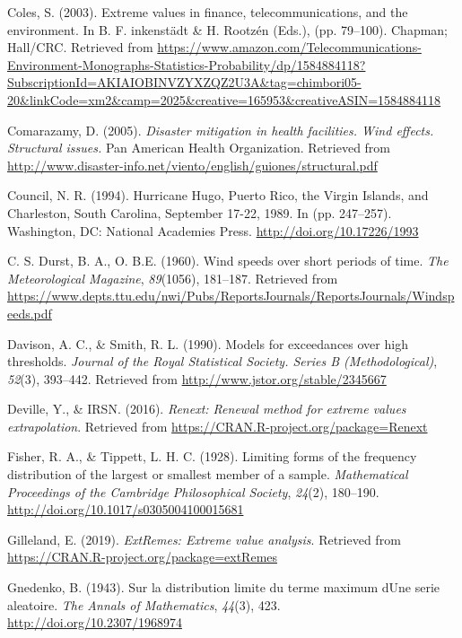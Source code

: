 \documentclass[12pt,twoside]{reedthesis}
\begin{document}
\leavevmode\hypertarget{ref-Coles2003}{}%
Coles, S. (2003). Extreme values in finance, telecommunications, and the environment. In B. F. inkenstädt \& H. Rootzén (Eds.), (pp. 79--100). Chapman; Hall/CRC. Retrieved from \url{https://www.amazon.com/Telecommunications-Environment-Monographs-Statistics-Probability/dp/1584884118?SubscriptionId=AKIAIOBINVZYXZQZ2U3A\&tag=chimbori05-20\&linkCode=xm2\&camp=2025\&creative=165953\&creativeASIN=1584884118}

\leavevmode\hypertarget{ref-windeffects}{}%
Comarazamy, D. (2005). \emph{Disaster mitigation in health facilities. Wind effects. Structural issues.} Pan American Health Organization. Retrieved from \url{http://www.disaster-info.net/viento/english/guiones/structural.pdf}

\leavevmode\hypertarget{ref-winddamage}{}%
Council, N. R. (1994). Hurricane Hugo, Puerto Rico, the Virgin Islands, and Charleston, South Carolina, September 17-22, 1989. In (pp. 247--257). Washington, DC: National Academies Press. \url{http://doi.org/10.17226/1993}

\leavevmode\hypertarget{ref-Durst1960}{}%
C. S. Durst, B. A., O. B.E. (1960). Wind speeds over short periods of time. \emph{The Meteorological Magazine}, \emph{89}(1056), 181--187. Retrieved from \url{https://www.depts.ttu.edu/nwi/Pubs/ReportsJournals/ReportsJournals/Windspeeds.pdf}

\leavevmode\hypertarget{ref-Davison1990}{}%
Davison, A. C., \& Smith, R. L. (1990). Models for exceedances over high thresholds. \emph{Journal of the Royal Statistical Society. Series B (Methodological)}, \emph{52}(3), 393--442. Retrieved from \url{http://www.jstor.org/stable/2345667}

\leavevmode\hypertarget{ref-Deville2016}{}%
Deville, Y., \& IRSN. (2016). \emph{Renext: Renewal method for extreme values extrapolation}. Retrieved from \url{https://CRAN.R-project.org/package=Renext}

\leavevmode\hypertarget{ref-Fisher1928}{}%
Fisher, R. A., \& Tippett, L. H. C. (1928). Limiting forms of the frequency distribution of the largest or smallest member of a sample. \emph{Mathematical Proceedings of the Cambridge Philosophical Society}, \emph{24}(2), 180--190. \url{http://doi.org/10.1017/s0305004100015681}

\leavevmode\hypertarget{ref-Gilleland2019}{}%
Gilleland, E. (2019). \emph{ExtRemes: Extreme value analysis}. Retrieved from \url{https://CRAN.R-project.org/package=extRemes}

\leavevmode\hypertarget{ref-Gnedenko1943}{}%
Gnedenko, B. (1943). Sur la distribution limite du terme maximum dUne serie aleatoire. \emph{The Annals of Mathematics}, \emph{44}(3), 423. \url{http://doi.org/10.2307/1968974}
\end{document}
